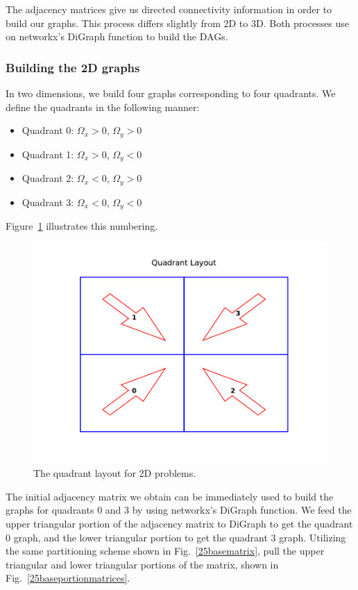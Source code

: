 The adjacency matrices give us directed connectivity information in order to build our graphs. This process differs slightly from 2D to 3D. Both processes use on networkx's DiGraph function to build the DAGs.

\subsubsection{Building the 2D graphs}
In two dimensions, we build four graphs corresponding to four quadrants.
We define the quadrants in the following manner:
\begin{itemize}
  \item Quadrant 0: $\Omega_x > 0$, $\Omega_y > 0$
  \item Quadrant 1: $\Omega_x > 0$, $\Omega_y < 0$
  \item Quadrant 2: $\Omega_x < 0$, $\Omega_y > 0$
  \item Quadrant 3: $\Omega_x < 0$, $\Omega_y < 0$
\end{itemize}
Figure~\ref{quadrant_layout} illustrates this numbering.
\begin{figure}[H]
\centering
\includegraphics{figures/quadrant_layout.pdf}
\caption{The quadrant layout for 2D problems.}
\label{quadrant_layout}
\end{figure}
The initial adjacency matrix we obtain can be immediately used to build the graphs for quadrants 0 and 3 by using networkx's DiGraph function.
We feed the upper triangular portion of the adjacency matrix to DiGraph to get the quadrant 0 graph, and the lower triangular portion to get the quadrant 3 graph.
Utilizing the same partitioning scheme shown in Fig.~\ref{25basematrix}, pull the upper triangular and lower triangular portions of the matrix, shown in Fig.~\ref{25baseportionmatrices}.
